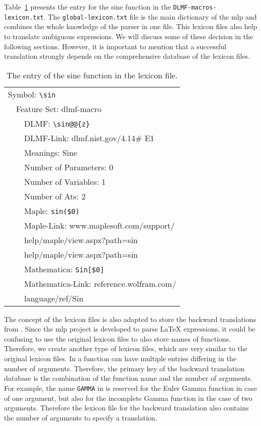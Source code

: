 Table~\ref{tab:sine-lex-example} presents the entry for the sine function in the \verb|DLMF-macros-lexicon.txt|. The \verb|global-lexicon.txt| file is the main dictionary of the \gls{mlp} and combines the whole knowledge of the parser in one file. This lexicon files also help to translate ambiguous expressions. We will discuss some of these decision in the following sections. However, it is important to mention that a successful translation strongly depends on the comprehensive database of the lexicon files.

\begin{table}
	\centering
	\begin{tabular}{lll}
	\hline
	\multicolumn{3}{l}{Symbol: \texttt{\textbackslash sin}} \\
	\! & \multicolumn{2}{l}{Feature Set: dlmf-macro} \\
	\! & \! & DLMF: \verb|\sin@@{z}|\\
	\! & \! & DLMF-Link: dlmf.nist.gov/4.14\# E1\\
	\! & \! & Meanings: Sine\\
	\! & \! & Number of Parameters: 0\\
	\! & \! & Number of Variables: 1\\
	\! & \! & Number of Ats: 2\\
	\! & \! & Maple: \verb|sin($0)|\\
	\! & \! & Maple-Link: www.maplesoft.com/support/\\
	\! & \! & \hspace{32pt} help/maple/view.aspx?path=sin\\
	\! & \! & help/maple/view.aspx?path=sin\\
	\! & \! & Mathematica: \verb|Sin[$0]|\\
	\! & \! & Mathematica-Link: reference.wolfram.com/\\
	\! & \! & \hspace{32pt} language/ref/Sin\\
	\hline
	\end{tabular}
	\caption{The entry of the sine function in the lexicon file.}
	\label{tab:sine-lex-example}
\end{table}

The concept of the lexicon files is also adapted to store the backward translations from \Maple. Since the \gls{mlp} project is developed to parse \LaTeX{} expressions, it could be confusing to use the original lexicon files to also store names of \Maple{} functions. Therefore, we create another type of lexicon files, which are very similar to the original lexicon files. In \Maple{} a function can have multiple entries differing in the number of arguments. Therefore, the primary key of the backward translation database is the combination of the function name and the number of arguments. For example, the name \verb|GAMMA| in \Maple{} is reserved for the Euler Gamma function in case of one argument, but also for the incomplete Gamma function in the case of two arguments. Therefore the lexicon file for the backward translation also contains the number of arguments to specify a translation.

